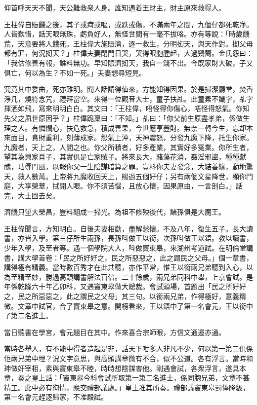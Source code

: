 \documentclass[a5paper, 12pt, openany]{book} %
\begin{document}
	仰首呼天天不聞，天公難救衆人身。誰知遇着王財主，財主原來救得人。

	王柱偉自賑饑之後，其子或疴或嘔，或跌或傷，不滿兩年之間，九個仔都死乾净。人皆歎惜，話天眼無珠，虧負好人，無怪世間有一毫不拔咯。亦有等說：「時歲饑荒，天意要將人餓死。王柱偉大施賑濟，逐一救生，分明抝天，與天作對。抝父母都有罪，何況抝天？」柱偉夫妻閉門日哭，哭得眼胞腫起，大過鷄膥。金氏怨曰：「我估修善有報，誰料無功。早知賑濟抝天，我自一錢不出。今既家財大破，子又俱亡，何以為生？不如一死。」夫妻想尋短見。

	究竟其中委曲，死亦難明。聞人話請得仙來，方能知得因果。於是掃潔廳堂，焚香淨几，燒符念咒，禮拜當空。來得一位觀音大士，童子扶乩。此童素不識字，乩字揮洒如飛，寫來明明白白。其文曰：「王柱偉，唔怪得你傷心，唔怪得怒氣。你知先父之夙世原因乎？」柱偉跪稟曰：「不知。」乩曰：「你父前生原盡孝弟，係做生理之人。有憐憫心，扶危救急，積成善果，今世應享豐財。無奈一轉今生，忘却本來面目，貪財重利，刻薄成家。怨氣上沖，天神震怒，分發九魔下降，托生你家。九魔者，天上之，人間之也。你父所積者，好多產業，其實好多冤業。你所生者，望其為興家肖子，其實俱是亡家賊子。將來長大，賭蕩花消，姦淫邪盜，種種獻醜，玷辱門風，以報你父一生陰謀暗算之罪。豈料你夫妻發念，大結善緣，動地驚天，救人數萬。上帝將九魔收回天上，賜過五個好仔；另有兩個文星降世，顯你門庭，大享榮華，拭開人眼。你不須苦惱，且放心懷，因果原由，一言剖白。」話完，大士回去矣。

	濟饑只望大榮昌，豈料翻成一掃光。為祖不修殃後代，諸孫俱是大魔王。

	王柱偉聞言，方知明白。自後夫妻相勸，盡解愁懷。不及八年，復生五子。長大讀書，亦皆入學。第三仔所生兩孫，長孫呌做王以銜，次孫呌做王以鋙。教以讀書，少年入學，及至者等。遇一個學院大人，呌做竇東皋，來湖州考道試。在明倫堂講書，講大學首卷：「民之所好好之，民之所惡惡之，此之謂民之父母。」個一章書，講得極有精義。當時數百秀才在此共聽，亦作平常，惟王以銜兩兄弟聽到入心，以為至精至妙，勝過高頭講書解法百倍。二十餘歲，兩兄弟同科中舉，上京會試。是年係乾隆六十年乙卯科，又遇竇東皋做大總裁。會試頭場，首題出「民之所好好之，民之所惡惡之，此之謂民之父母」其三句。以銜兩兄弟，作得極好，意義精微。文章中試官，合了竇東皋之意。開榜看來，王以鋙中了第一名會元，王以銜中了第二名進土。

	當日聽書在學宮，會元題目在其中。作來喜合宗師眼，方信文通運亦通。

	當時各舉人，有不能中得者造起是非，話天下咁多人非凡不少，何以第一第二俱係佢兩兄弟中埋？況文字意思，與高頭講章微有不合，似不公道。各有浮言。當時和珅做奸宰相，素與竇東皋不睦，時時想陰謀害他。剛遇會試，各衆浮言，遂具本章，奏之皇上話：「竇東皋今科會試所取第一第二名進士，係同胞兄弟，文章不甚精工。此中必有徇情，應交禮部議處。」皇上准其所奏。禮部議竇東皋罰俸降級，第一名會元趕逐歸家，不准殿試。
\end{document}
